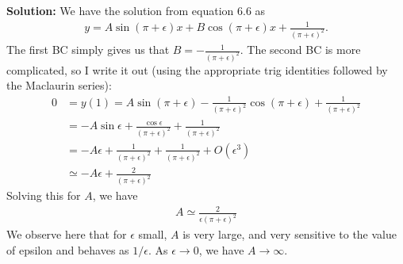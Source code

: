 \documentclass[11pt]{article}
\def\f{\frac }
\begin{document}
\begin{enumerate}
\bigskip
\textbf{Solution:} We have the solution from equation 6.6 as 
\begin{align*} y = A \sin (\pi+\epsilon) x + B\cos (\pi+\epsilon) x + \f{1}{(\pi+\epsilon)^2}. \end{align*}
The first BC simply gives us that $B = -\f{1}{(\pi+\epsilon)^2}$.
The second BC is more complicated, so I write it out (using the appropriate trig identities followed by the Maclaurin series):
\begin{align*} 0 &= y(1) = A \sin (\pi+\epsilon) -\f{1}{(\pi+\epsilon)^2} \cos (\pi+\epsilon) + \f{1}{(\pi+\epsilon)^2}\\
&= -A \sin \epsilon + \f{\cos \epsilon }{(\pi+\epsilon)^2} + \f{1}{(\pi+\epsilon)^2}\\
&= -A \epsilon + \f{1 }{(\pi+\epsilon)^2} + \f{1}{(\pi+\epsilon)^2} + O(\epsilon ^3)\\
&\simeq -A \epsilon + \f{2}{(\pi+\epsilon)^2} \end{align*}
Solving this for $A$, we have
\begin{align*}A \simeq \f{2}{\epsilon (\pi+\epsilon)^2}\end{align*}
We observe here that for $\epsilon$ small, $A$ is very large, and very sensitive to the value of epsilon and behaves as $1/\epsilon$.
As $\epsilon \to 0$, we have $A \to \infty$.\\



\end{enumerate}
\end{document}
